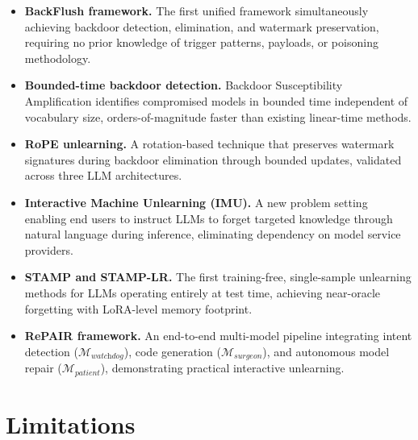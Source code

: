 \begin{itemize}
    \item \textbf{BackFlush framework.} The first unified framework simultaneously achieving backdoor detection, elimination, and watermark preservation, requiring no prior knowledge of trigger patterns, payloads, or poisoning methodology.

    \item \textbf{Bounded-time backdoor detection.} Backdoor Susceptibility Amplification identifies compromised models in bounded time independent of vocabulary size, orders-of-magnitude faster than existing linear-time methods.

    \item \textbf{RoPE unlearning.} A rotation-based technique that preserves watermark signatures during backdoor elimination through bounded updates, validated across three LLM architectures.

    \item \textbf{Interactive Machine Unlearning (IMU).} A new problem setting enabling end users to instruct LLMs to forget targeted knowledge through natural language during inference, eliminating dependency on model service providers.

    \item \textbf{STAMP and STAMP-LR.} The first training-free, single-sample unlearning methods for LLMs operating entirely at test time, achieving near-oracle forgetting with LoRA-level memory footprint.

    \item \textbf{RePAIR framework.} An end-to-end multi-model pipeline integrating intent detection ($\mathcal{M}_{\textit{watchdog}}$), code generation ($\mathcal{M}_{\textit{surgeon}}$), and autonomous model repair ($\mathcal{M}_{\textit{patient}}$), demonstrating practical interactive unlearning.
\end{itemize}


\section{Limitations}

